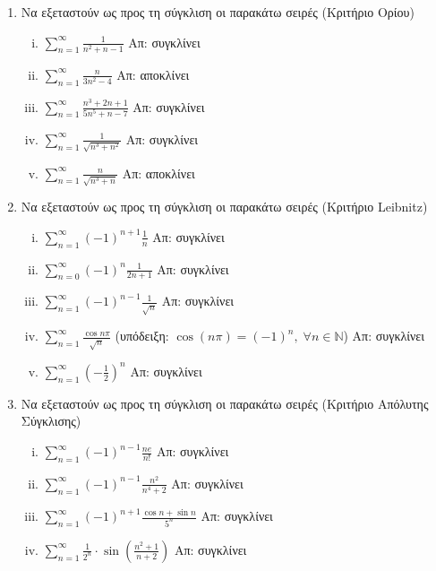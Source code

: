 \begin{enumerate}
    \item Να εξεταστούν ως προς τη σύγκλιση οι παρακάτω σειρές (Κριτήριο Ορίου)
        \begin{enumerate}[i)]
            \item $ \sum_{n=1}^{\infty} \frac{1}{n^{2}+n-1} $ \hfill Απ: συγκλίνει 
            \item $ \sum_{n=1}^{\infty} \frac{n}{3n^{2}-4}  $ \hfill Απ: αποκλίνει 
            \item $ \sum_{n=1}^{\infty} \frac{n^{3}+2n+1}{5n^{5}+n-7}  $ \hfill Απ: 
                συγκλίνει
            \item $ \sum_{n=1}^{\infty} \frac{1}{\sqrt{n^{3}+n^{2}}}  $ \hfill Απ: 
                συγκλίνει
            \item $ \sum_{n=1}^{\infty} \frac{n}{\sqrt{n^{3}+n}} $ \hfill Απ: 
                αποκλίνει
        \end{enumerate}

    \item Να εξεταστούν ως προς τη σύγκλιση οι παρακάτω σειρές (Κριτήριο Leibnitz)
        \begin{enumerate}[i)]
            \item $ \sum_{n=1}^{\infty} (-1)^{n+1} \frac{1}{n} $ \hfill Απ: συγκλίνει 
            \item $ \sum_{n=0}^{\infty} (-1)^{n} \frac{1}{2n+1} $ 
                \hfill Απ: συγκλίνει 
            \item $ \sum_{n=1}^{\infty} (-1)^{n-1} \frac{1}{\sqrt{n}}  $ \hfill Απ: 
                συγκλίνει
            \item $ \sum_{n=1}^{\infty} \frac{\cos{n \pi}}{\sqrt{n}} $ 
                \qquad (υπόδειξη: $ \cos{(n \pi)} = (-1)^{n}, \; \forall n 
                \in \mathbb{N}  $) \hfill Απ: συγκλίνει
            \item $ \sum_{n=1}^{\infty} \left(- \frac{1}{2}\right)^{n} $ \hfill Απ: 
                συγκλίνει
        \end{enumerate}

    \item Να εξεταστούν ως προς τη σύγκλιση οι παρακάτω σειρές (Κριτήριο Απόλυτης 
        Σύγκλισης)
        \begin{enumerate}[i)]
            \item $ \sum_{n=1}^{\infty} (-1)^{n-1} \frac{ne}{n!} $ \hfill Απ: 
                συγκλίνει
            \item $ \sum_{n=1}^{\infty} (-1)^{n-1} \frac{n^{2}}{n^{4}+2}  $ \hfill Απ: 
                συγκλίνει
            \item $ \sum_{n=1}^{\infty} (-1)^{n+1} \frac{\cos{n} + \sin{n}}{5^{n}} $ 
                \hfill Απ: συγκλίνει 
            \item $ \sum_{n=1}^{\infty} \frac{1}{2^{n}} \cdot 
                \sin{\left(\frac{n^{2}+1}{n+2}\right)}$ \hfill Απ: συγκλίνει 
        \end{enumerate}
\end{enumerate}


\vspace{\baselineskip}



